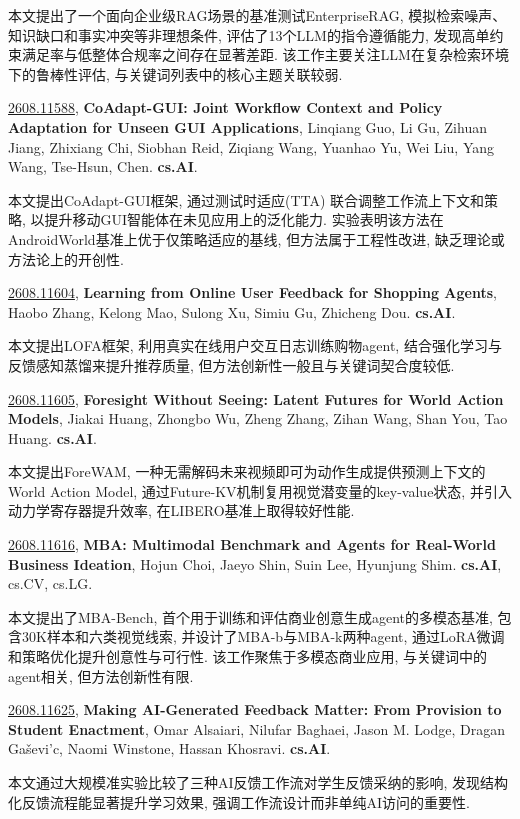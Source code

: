 \documentclass[9pt, a4paper]{article}
\theoremstyle{plain}
\theoremstyle{definition}
\theoremstyle{remark}
\newcommand{\arxivwithtarget}[3]{\hypertarget{#1}{}\href{https://arxiv.org/abs/#1}{#1}, \textbf{\textcolor{arxivblue}{#2}}, #3. }
\begin{document}
本文提出了一个面向企业级RAG场景的基准测试EnterpriseRAG, 模拟检索噪声、知识缺口和事实冲突等非理想条件, 评估了13个LLM的指令遵循能力, 发现高单约束满足率与低整体合规率之间存在显著差距. 该工作主要关注LLM在复杂检索环境下的鲁棒性评估, 与关键词列表中的核心主题关联较弱.


\arxivwithtarget{2608.11588}{CoAdapt-GUI: Joint Workflow Context and Policy Adaptation for Unseen GUI Applications}{Linqiang Guo, Li Gu, Zihuan Jiang, Zhixiang Chi, Siobhan Reid, Ziqiang Wang, Yuanhao Yu, Wei Liu, Yang Wang, Tse-Hsun, Chen}\textbf{cs.AI}.

本文提出CoAdapt-GUI框架, 通过测试时适应(TTA) 联合调整工作流上下文和策略, 以提升移动GUI智能体在未见应用上的泛化能力. 实验表明该方法在AndroidWorld基准上优于仅策略适应的基线, 但方法属于工程性改进, 缺乏理论或方法论上的开创性.


\arxivwithtarget{2608.11604}{Learning from Online User Feedback for Shopping Agents}{Haobo Zhang, Kelong Mao, Sulong Xu, Simiu Gu, Zhicheng Dou}\textbf{cs.AI}.

本文提出LOFA框架, 利用真实在线用户交互日志训练购物agent, 结合强化学习与反馈感知蒸馏来提升推荐质量, 但方法创新性一般且与关键词契合度较低.


\arxivwithtarget{2608.11605}{Foresight Without Seeing: Latent Futures for World Action Models}{Jiakai Huang, Zhongbo Wu, Zheng Zhang, Zihan Wang, Shan You, Tao Huang}\textbf{cs.AI}.

本文提出ForeWAM, 一种无需解码未来视频即可为动作生成提供预测上下文的World Action Model, 通过Future-KV机制复用视觉潜变量的key-value状态, 并引入动力学寄存器提升效率, 在LIBERO基准上取得较好性能.


\arxivwithtarget{2608.11616}{MBA: Multimodal Benchmark and Agents for Real-World Business Ideation}{Hojun Choi, Jaeyo Shin, Suin Lee, Hyunjung Shim}\textbf{cs.AI}, cs.CV, cs.LG.

本文提出了MBA-Bench, 首个用于训练和评估商业创意生成agent的多模态基准, 包含30K样本和六类视觉线索, 并设计了MBA-b与MBA-k两种agent, 通过LoRA微调和策略优化提升创意性与可行性. 该工作聚焦于多模态商业应用, 与关键词中的agent相关, 但方法创新性有限.


\arxivwithtarget{2608.11625}{Making AI-Generated Feedback Matter: From Provision to Student Enactment}{Omar Alsaiari, Nilufar Baghaei, Jason M. Lodge, Dragan Gaševi'c, Naomi Winstone, Hassan Khosravi}\textbf{cs.AI}.

本文通过大规模准实验比较了三种AI反馈工作流对学生反馈采纳的影响, 发现结构化反馈流程能显著提升学习效果, 强调工作流设计而非单纯AI访问的重要性.
\end{document}
